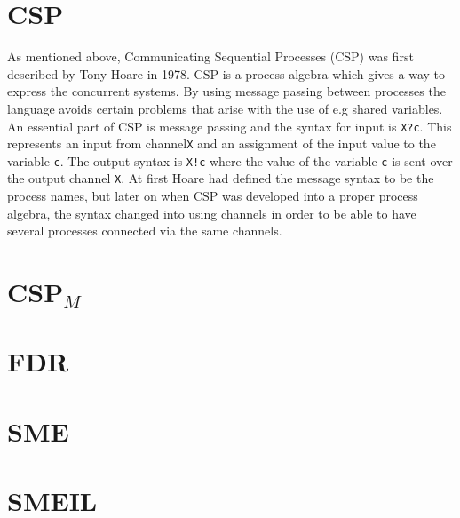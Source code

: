 \documentclass[a4paper]{report}
\newcommand{\cspm}{CSP$_M$ }
\begin{document}
\section{CSP}
As mentioned above, Communicating Sequential Processes (CSP) was first described by Tony Hoare in 1978. CSP is a process algebra which gives a way to express the concurrent systems. By using message passing between processes the language avoids certain problems that arise with the use of e.g shared variables. An essential part of CSP is message passing and the syntax for input is \texttt{X?c}. This represents an input from channel\texttt{X} and an assignment of the input value to the variable \texttt{c}. The output syntax is \texttt{X!c} where the value of the variable \texttt{c} is sent over the output channel \texttt{X}. At first Hoare had defined the message syntax to be the process names, but later on when CSP was developed into a proper process algebra, the syntax changed into using channels in order to be able to have several processes connected via the same channels.  
\section{\cspm}
\section{FDR}
\section{SME}
\section{SMEIL}
\end{document}

